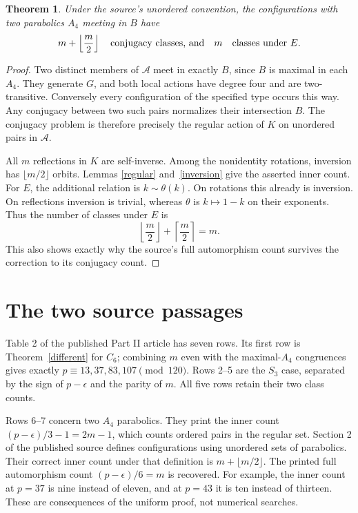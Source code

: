 \documentclass[11pt]{article}
\newtheorem{theorem}[lemma]{Theorem}
\begin{document}
\begin{theorem}\label{equal}
Under the source's unordered convention, the configurations with two
parabolics $A_4$ meeting in $B$ have
\[
 m+\left\lfloor\frac m2\right\rfloor
 \quad\hbox{conjugacy classes, and}\quad m
 \quad\hbox{classes under }E.
\]
\end{theorem}
\begin{proof}
Two distinct members of $\mathcal A$ meet in exactly $B$, since
$B$ is maximal in each $A_4$. They generate $G$, and both local
actions have degree four and are two-transitive. Conversely every
configuration of the specified type occurs this way. Any conjugacy
between two such pairs normalizes their intersection $B$.
The conjugacy problem is therefore precisely the regular action of
$K$ on unordered pairs in $\mathcal A$.

All $m$ reflections in $K$ are self-inverse. Among the nonidentity
rotations, inversion has $\lfloor m/2\rfloor$ orbits. Lemmas
\ref{regular} and~\ref{inversion} give the asserted inner count.
For $E$, the additional relation is $k\sim\theta(k)$. On rotations
this already is inversion. On reflections inversion is trivial,
whereas $\theta$ is $k\mapsto1-k$ on their exponents. Thus the
number of classes under $E$ is
\[
 \left\lfloor\frac m2\right\rfloor+
 \left\lceil\frac m2\right\rceil=m.
\]
This also shows exactly why the source's full automorphism count
survives the correction to its conjugacy count.
\end{proof}

\section{The two source passages}
Table 2 of the published Part II article has seven rows. Its first
row is Theorem~\ref{different} for $C_6$; combining $m$ even with
the maximal-$A_4$ congruences gives exactly
$p\equiv13,37,83,107\pmod {120}$. Rows 2--5 are the $S_3$
case, separated by the sign of $p-\epsilon$ and the parity of $m$.
All five rows retain their two class counts.

Rows 6--7 concern two $A_4$ parabolics. They print the inner count
$(p-\epsilon)/3-1=2m-1$, which counts ordered pairs in the regular
set. Section 2 of the published source defines configurations using
unordered sets of parabolics. Their correct inner count under that
definition is $m+\lfloor m/2\rfloor$. The printed full automorphism
count $(p-\epsilon)/6=m$ is recovered. For example, the inner count
at $p=37$ is nine instead of eleven, and at $p=43$ it is ten
instead of thirteen. These are consequences of the uniform proof,
not numerical searches.
\end{document}
